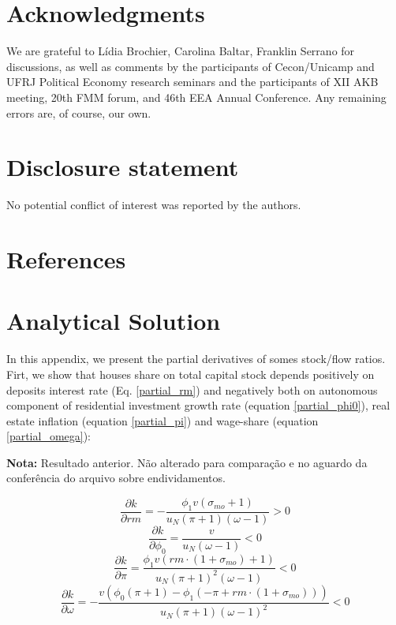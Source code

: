 \documentclass[11pt]{article}
\begin{document}
\section*{Acknowledgments}
\label{sec:org9c438fe}
\noindent We  are  grateful  to  Lídia  Brochier,  Carolina  Baltar,  Franklin  Serrano  for  discussions,  as  well  as  comments  by  the participants of Cecon/Unicamp and UFRJ Political Economy research seminars and the participants of XII AKB meeting, 20th FMM forum, and 46th EEA Annual Conference. Any remaining errors are, of course, our own.

\section*{Disclosure statement}
\label{sec:org783305c}
No potential conflict of interest was reported by the authors.


\section*{References}
\label{sec:orge8bf8b5}
\printbibliography[heading=none]


\appendix

\section{Analytical Solution}
\label{sec:orgfe2dad9}
\label{append:Solution}

In this appendix, we present the partial derivatives of somes stock/flow ratios.
Firt, we show that houses share on total capital stock depends positively on deposits interest rate (Eq. \ref{partial_rm}) and negatively both on autonomous component of residential investment growth rate (equation \ref{partial_phi0}), real estate inflation (equation \ref{partial_pi}) and wage-share (equation \ref{partial_omega}):

\textbf{Nota:} Resultado anterior. Não alterado para comparação e no aguardo da conferência do arquivo sobre endividamentos.

\begin{equation}
\label{partial_rm}
\frac{\partial k}{\partial rm} = - \frac{\phi_{1} v \left(\sigma_{mo} + 1\right)}{u_N \left(\pi + 1\right) \left(\omega - 1\right)} > 0
\end{equation}
\begin{equation}
\label{partial_phi0}
\frac{\partial k}{\partial \phi_0} = \frac{v}{u_N \left(\omega - 1\right)} < 0
\end{equation}
\begin{equation}
\label{partial_pi}
\frac{\partial k}{\partial \pi} = \frac{\phi_{1} v \left(rm\cdot(1+\sigma_{mo}) + 1\right)}{u_N \left(\pi + 1\right)^{2} \left(\omega - 1\right)} < 0
\end{equation}
\begin{equation}
\label{partial_omega}
\frac{\partial k}{\partial \omega} = - \frac{v \left(\phi_{0} \left(\pi + 1\right) - \phi_{1} \left(- \pi + rm\cdot(1 + \sigma_{mo})\right)\right)}{u_N \left(\pi + 1\right) \left(\omega - 1\right)^{2}} < 0
\end{equation}
\end{document}
